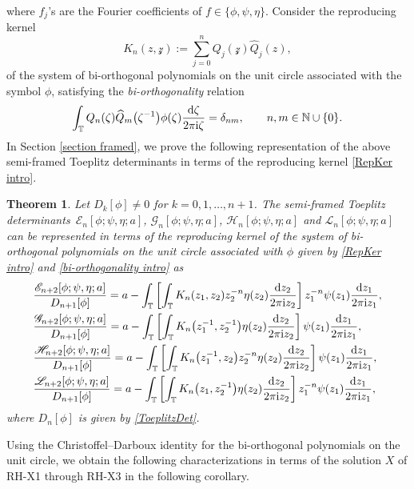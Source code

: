 \documentclass[10pt,a4paper]{amsart}
\numberwithin{equation}{section}
\newtheorem{Theorem}{Theorem}[section]
\newcommand{\N}{{\mathbb N}}
\newcommand{\T}{{\mathbb T}}
\newcommand{\de}{\delta}
\newcommand{\ze}{\zeta}
\newcommand{\ii}{{\rm i}}
\newcommand{\dd}{{\rm d}}
\begin{document}
	where $f_j$'s are the Fourier coefficients of $f \in \{ \phi, \psi, \eta \}$. Consider the reproducing kernel
	\begin{equation}\label{RepKer intro}
		K_{n}(z,\mathcal{z}) := \sum_{j=0}^{n} Q_{j}(\mathcal{z})\widehat{Q}_{j}(z),
	\end{equation} of the system of bi-orthogonal polynomials on the unit circle associated with the symbol $\phi$, satisfying the \textit{bi-orthogonality} relation
	\begin{equation}\label{bi-orthogonality intro}
		\int_{\T} Q_n(\ze)\widehat{Q}_m\big(\ze^{-1}\big)\phi(\ze)\frac{\dd \ze}{2\pi \ii \ze}= \de_{nm}, \qquad n,m \in \N \cup \{0\}.
	\end{equation}
	In Section \ref{section framed}, we prove the following representation of the above semi-framed Toeplitz determinants in terms of the reproducing kernel \eqref{RepKer intro}.
	
	\begin{Theorem}\label{semis in terms of RepKer intro}
		Let $D_k[\phi] \neq 0$ for $k=0,1,\dots, n+1$.	The semi-framed Toeplitz determinants~${\mathscr{E}_n[\phi;\psi,\eta;a]}$, $\mathscr{G}_n[\phi;\psi,\eta;a]$, $\mathscr{H}_n[\phi;\psi,\eta;a]$ and $\mathscr{L}_n[\phi;\psi,\eta;a]$ can be represented in terms of the reproducing kernel of the system of bi-orthogonal polynomials on the unit circle associated with $\phi$ given by \eqref{RepKer intro} and \eqref{bi-orthogonality intro} as
		\begin{align}
			&\frac{\mathscr{E}_{n+2}[\phi; \psi, \eta ;a]}{D_{n+1}[\phi]} = a - \int_{\T} \left[ \int_{\T} K_n(z_1,z_2) z_2^{-n} \eta(z_2) \frac{\dd z_2}{2 \pi \ii z_2} \right] z_1^{-n} \psi(z_1) \frac{\dd z_1}{2 \pi \ii z_1}, \nonumber \\
& \frac{\mathscr{G}_{n+2}[\phi; \psi, \eta ;a]}{D_{n+1}[\phi]} = a - \int_{\T} \left[ \int_{\T} K_n\big(z^{-1}_1,z^{-1}_2\big) \eta(z_2) \frac{\dd z_2}{2 \pi \ii z_2} \right] \psi(z_1) \frac{\dd z_1}{2 \pi \ii z_1}, \nonumber \\
& \frac{\mathscr{H}_{n+2}[\phi; \psi, \eta ;a]}{D_{n+1}[\phi]} = a - \int_{\T} \left[ \int_{\T} K_n\big(z^{-1}_1,z_2\big) z_2^{-n} \eta(z_2) \frac{\dd z_2}{2 \pi \ii z_2} \right] \psi(z_1) \frac{\dd z_1}{2 \pi \ii z_1}, \label{H} \\
& \frac{\mathscr{L}_{n+2}[\phi; \psi, \eta ;a]}{D_{n+1}[\phi]} = a - \int_{\T} \left[ \int_{\T} K_n\big(z_1,z^{-1}_2\big) \eta(z_2) \frac{\dd z_2}{2 \pi \ii z_2} \right] z^{-n}_1 \psi(z_1) \frac{\dd z_1}{2 \pi \ii z_1}, \nonumber
		\end{align}
		where $D_{n}[\phi]$ is given by \eqref{ToeplitzDet}.
	\end{Theorem}
	Using the Christoffel--Darboux identity for the bi-orthogonal polynomials on the unit circle, we obtain the following characterizations in terms of the solution $X$ of {\rm RH-X1} through {\rm RH-X3} in the following corollary.
	
\end{document}
